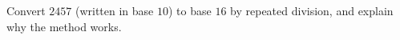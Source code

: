 Convert $2457$ (written in base $10$) to base $16$ by repeated division, and explain why the method works.
